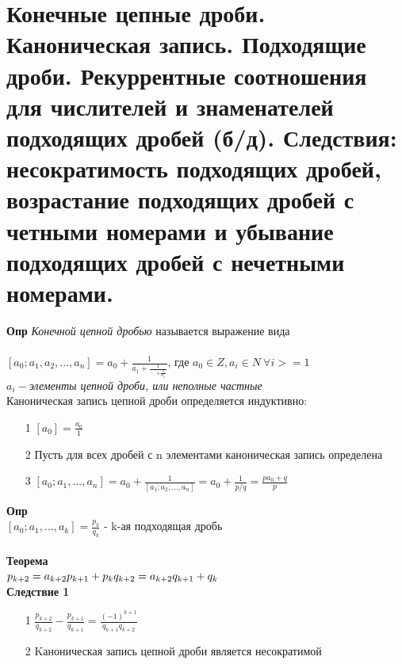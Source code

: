 \setcounter{section}{24}

\section{Конечные цепные дроби. Каноническая запись. Подходящие дроби. Рекуррентные соотношения для
числителей и знаменателей подходящих дробей (б/д). Следствия: несократимость подходящих дробей,
возрастание подходящих дробей с четными номерами и убывание подходящих дробей с нечетными
номерами.}
\textbf{Опр}\textit{ Конечной цепной дробью} называется выражение вида
\\
\\
$[a_0; a_1, a_2, ..., a_n] = a_0 +\frac{1}{ a_1 + \frac{1}{\ddots + \frac{1}{a_n}}}$, где $a_0 \in Z, a_i \in N \ \forall i >=1$\\
$a_i - $\textit{элементы цепной дроби, или неполные частные}
\\
Каноническая запись цепной дроби определяется индуктивно:\\
\begin{itemize}
    \item[1] $[a_0] = \frac{a_0}{1}$
    \item[2] Пусть для всех дробей с n элементами каноническая запись определена
    \item[3] $[a_0; a_1, ..., a_n] = a_0 + \frac{1}{[a_1; a_2, ..., a_n]} = a_0 + \frac{1}{p/q} = \frac{pa_0 + q}{p}$ 
\end{itemize}
\textbf{Опр}\\ $[a_0; a_1, ..., a_k] = \frac{p_k}{q_k}$ - k-ая подходящая дробь
\\
\\
\textbf{Теорема}\\
$p_{k+2} = a_{k+2}p_{k+1} + p_k \\ q_{k+2} = a_{k+2}q_{k+1} + q_k$
\\

\textbf{Следствие 1}
\begin{itemize}
\item[1] $\frac{p_{k+2}}{q_{k+2}} - \frac{p_{k+1}}{q_{k+1}} = \frac{(-1)^{k+1}}{q_{k+1}q_{k+2}}$
    \item [2] Kаноническая запись цепной дроби является несократимой
\end{itemize}

